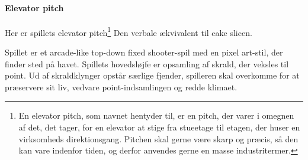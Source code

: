 \paragraph{Elevator pitch}\label{par:elevator_pitch}
Her er spillets elevator pitch\footnote{En elevator pitch, som navnet hentyder til, er en pitch, der varer i omegnen af det, det tager, for en elevator at stige fra stueetage til etagen, der huser en virksomheds direktionsgang. Pitchen skal gerne være skarp og præcis, så den kan vare indenfor tiden, og derfor anvendes gerne en masse industritermer.} Den verbale ækvivalent til cake slicen.
\begin{displayquote}
Spillet er et arcade-like top-down fixed shooter-spil med en pixel art-stil, der finder sted på havet. Spillets hovedsløjfe er opsamling af skrald, der veksles til point. Ud af skraldklynger opstår særlige fjender, spilleren skal overkomme for at præservere sit liv, vedvare point-indsamlingen og redde klimaet.
\end{displayquote}
